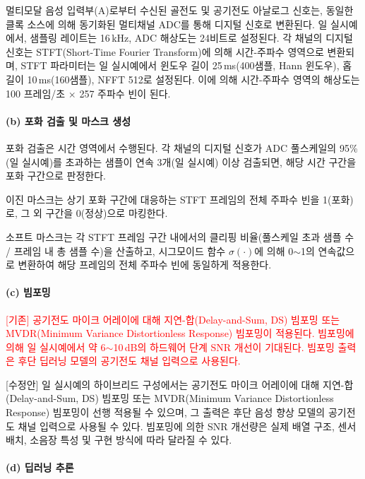 \documentclass{article}
\newcommand{\reviewold}[1]{{\par\noindent\textcolor{red}{[기존] #1}}}
\newcommand{\reviewnew}[1]{{\par\noindent\textcolor{customblue}{[수정안] #1}}}
\newcommand{\reviewpair}[2]{\reviewold{#1}\reviewnew{#2}\par}
\begin{document}
멀티모달 음성 입력부(A)로부터 수신된 골전도 및 공기전도 아날로그 신호는, 동일한 클록 소스에 의해 동기화된 멀티채널 ADC를 통해 디지털 신호로 변환된다. 일 실시예에서, 샘플링 레이트는 16\,kHz, ADC 해상도는 24비트로 설정된다. 각 채널의 디지털 신호는 STFT(Short-Time Fourier Transform)에 의해 시간-주파수 영역으로 변환되며, STFT 파라미터는 일 실시예에서 윈도우 길이 25\,ms(400샘플, Hann 윈도우), 홉 길이 10\,ms(160샘플), NFFT 512로 설정된다. 이에 의해 시간-주파수 영역의 해상도는 100 프레임/초 $\times$ 257 주파수 빈이 된다.

\paragraph{(b) 포화 검출 및 마스크 생성}

포화 검출은 시간 영역에서 수행된다. 각 채널의 디지털 신호가 ADC 풀스케일의 95\%(일 실시예)를 초과하는 샘플이 연속 3개(일 실시예) 이상 검출되면, 해당 시간 구간을 포화 구간으로 판정한다.

이진 마스크는 상기 포화 구간에 대응하는 STFT 프레임의 전체 주파수 빈을 1(포화)로, 그 외 구간을 0(정상)으로 마킹한다.

소프트 마스크는 각 STFT 프레임 구간 내에서의 클리핑 비율(풀스케일 초과 샘플 수 / 프레임 내 총 샘플 수)을 산출하고, 시그모이드 함수 $\sigma(\cdot)$에 의해 0$\sim$1의 연속값으로 변환하여 해당 프레임의 전체 주파수 빈에 동일하게 적용한다.

\paragraph{(c) 빔포밍}

\reviewpair{공기전도 마이크 어레이에 대해 지연-합(Delay-and-Sum, DS) 빔포밍 또는 MVDR(Minimum Variance Distortionless Response) 빔포밍이 적용된다. 빔포밍에 의해 일 실시예에서 약 6$\sim$10\,dB의 하드웨어 단계 SNR 개선이 기대된다. 빔포밍 출력은 후단 딥러닝 모델의 공기전도 채널 입력으로 사용된다.}{일 실시예의 하이브리드 구성에서는 공기전도 마이크 어레이에 대해 지연-합(Delay-and-Sum, DS) 빔포밍 또는 MVDR(Minimum Variance Distortionless Response) 빔포밍이 선행 적용될 수 있으며, 그 출력은 후단 음성 향상 모델의 공기전도 채널 입력으로 사용될 수 있다. 빔포밍에 의한 SNR 개선량은 실제 배열 구조, 센서 배치, 소음장 특성 및 구현 방식에 따라 달라질 수 있다.}

\paragraph{(d) 딥러닝 추론}
\end{document}
